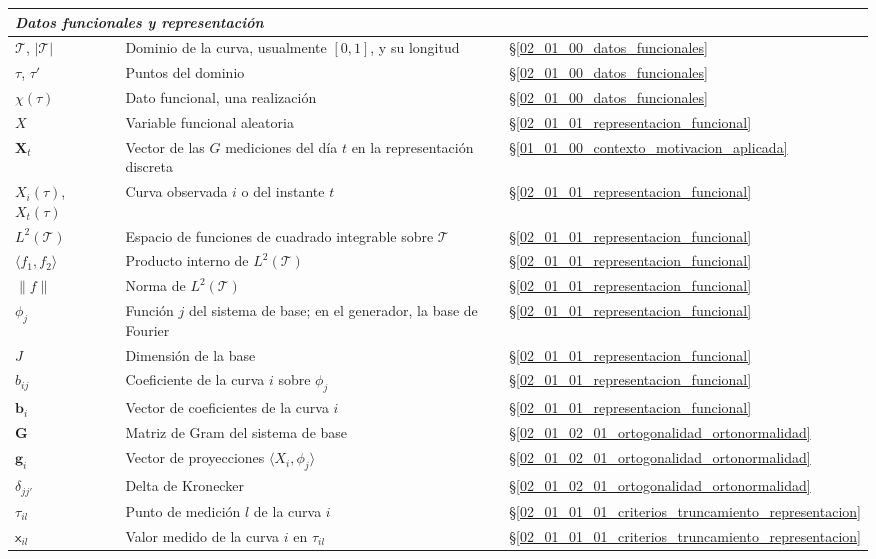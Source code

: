 \begin{longtable}{p{} p{} p{}}
\hline
\multicolumn{3}{l}{\textit{Datos funcionales y representación}} \\
\hline
$\mathcal{T}$, $|\mathcal{T}|$ & Dominio de la curva, usualmente $[0,1]$, y su longitud & \S\ref{02_01_00_datos_funcionales} \\
$\tau$, $\tau'$ & Puntos del dominio & \S\ref{02_01_00_datos_funcionales} \\
$\chi(\tau)$ & Dato funcional, una realización & \S\ref{02_01_00_datos_funcionales} \\
$X$ & Variable funcional aleatoria & \S\ref{02_01_01_representacion_funcional} \\
$\mathbf{X}_t$ & Vector de las $G$ mediciones del día $t$ en la representación discreta & \S\ref{01_01_00_contexto_motivacion_aplicada} \\
$X_i(\tau)$, $X_t(\tau)$ & Curva observada $i$ o del instante $t$ & \S\ref{02_01_01_representacion_funcional} \\
$L^2(\mathcal{T})$ & Espacio de funciones de cuadrado integrable sobre $\mathcal{T}$ & \S\ref{02_01_01_representacion_funcional} \\
$\langle f_1, f_2\rangle$ & Producto interno de $L^2(\mathcal{T})$ & \S\ref{02_01_01_representacion_funcional} \\
$\|f\|$ & Norma de $L^2(\mathcal{T})$ & \S\ref{02_01_01_representacion_funcional} \\
$\phi_j$ & Función $j$ del sistema de base; en el generador, la base de Fourier & \S\ref{02_01_01_representacion_funcional} \\
$J$ & Dimensión de la base & \S\ref{02_01_01_representacion_funcional} \\
$b_{ij}$ & Coeficiente de la curva $i$ sobre $\phi_j$ & \S\ref{02_01_01_representacion_funcional} \\
$\mathbf{b}_i$ & Vector de coeficientes de la curva $i$ & \S\ref{02_01_01_representacion_funcional} \\
$\mathbf{G}$ & Matriz de Gram del sistema de base & \S\ref{02_01_02_01_ortogonalidad_ortonormalidad} \\
$\mathbf{g}_i$ & Vector de proyecciones $\langle X_i, \phi_j\rangle$ & \S\ref{02_01_02_01_ortogonalidad_ortonormalidad} \\
$\delta_{jj'}$ & Delta de Kronecker & \S\ref{02_01_02_01_ortogonalidad_ortonormalidad} \\
$\tau_{il}$ & Punto de medición $l$ de la curva $i$ & \S\ref{02_01_01_01_criterios_truncamiento_representacion} \\
$\mathsf{x}_{il}$ & Valor medido de la curva $i$ en $\tau_{il}$ & \S\ref{02_01_01_01_criterios_truncamiento_representacion} \\

\end{longtable}
